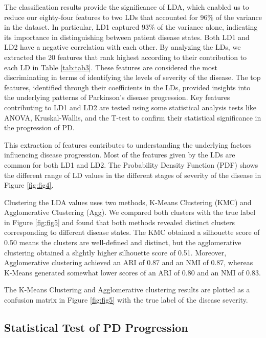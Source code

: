 \documentclass{article}
\begin{document}
The classification results provide the significance of LDA, which enabled us to reduce our eighty-four features to two LDs that accounted for 96\% of the variance in the dataset. In particular, LD1 captured 93\% of the variance alone, indicating its importance in distinguishing between patient disease states. Both LD1 and LD2 have a negative correlation with each other. By analyzing the LDs, we extracted the 20 features that rank highest according to their contribution to each LD in Table \ref{tab:tab3}. These features are considered the most discriminating in terms of identifying the levels of severity of the disease. The top features, identified through their coefficients in the LDs, provided insights into the underlying patterns of Parkinson's disease progression. Key features contributing to LD1 and LD2 are tested using some statistical analysis tests like ANOVA, Kruskal-Wallis, and the T-test to confirm their statistical significance in the progression of PD.

This extraction of features contributes to understanding the underlying factors influencing disease progression. Most of the features given by the LDs are common for both LD1 and LD2. The Probability Density Function (PDF) shows the different range of LD values in the different stages of severity of the disease in Figure \ref{fig:fig4}. 




Clustering the LDA values uses two methods, K-Means Clustering (KMC) and Agglomerative Clustering (Agg). We compared both clusters with the true label in Figure \ref{fig:fig5} and found that both methods revealed distinct clusters corresponding to different disease states. The KMC obtained a silhouette score of 0.50 means the clusters are well-defined and distinct, but the agglomerative clustering obtained a slightly higher silhouette score of 0.51. Moreover, Agglomerative clustering achieved an ARI of 0.87 and an NMI of 0.87, whereas K-Means generated somewhat lower scores of an ARI of 0.80 and an NMI of 0.83.

The K-Means Clustering and Agglomerative clustering results are plotted as a confusion matrix in Figure \ref{fig:fig5} with the true label of the disease severity.


\subsection{Statistical Test of PD Progression}
\label{PD Progression Result}
\end{document}

